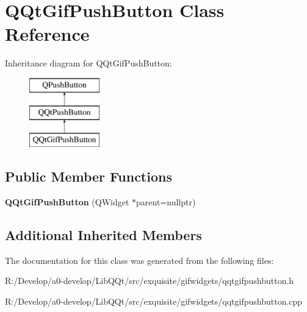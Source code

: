\hypertarget{class_q_qt_gif_push_button}{}\section{Q\+Qt\+Gif\+Push\+Button Class Reference}
\label{class_q_qt_gif_push_button}
Inheritance diagram for Q\+Qt\+Gif\+Push\+Button\+:\begin{figure}[H]
\begin{center}
\leavevmode
\includegraphics[height=3.000000cm]{class_q_qt_gif_push_button}
\end{center}
\end{figure}
\subsection*{Public Member Functions}
\begin{DoxyCompactItemize}
\item 
\mbox{\label{class_q_qt_gif_push_button_a829dd2cd133a0eabfe7d393d167c9373}} 
{\bfseries Q\+Qt\+Gif\+Push\+Button} (Q\+Widget $\ast$parent=nullptr)
\end{DoxyCompactItemize}
\subsection*{Additional Inherited Members}


The documentation for this class was generated from the following files\+:\begin{DoxyCompactItemize}
\item 
R\+:/\+Develop/a0-\/develop/\+Lib\+Q\+Qt/src/exquisite/gifwidgets/qqtgifpushbutton.\+h\item 
R\+:/\+Develop/a0-\/develop/\+Lib\+Q\+Qt/src/exquisite/gifwidgets/qqtgifpushbutton.\+cpp\end{DoxyCompactItemize}

